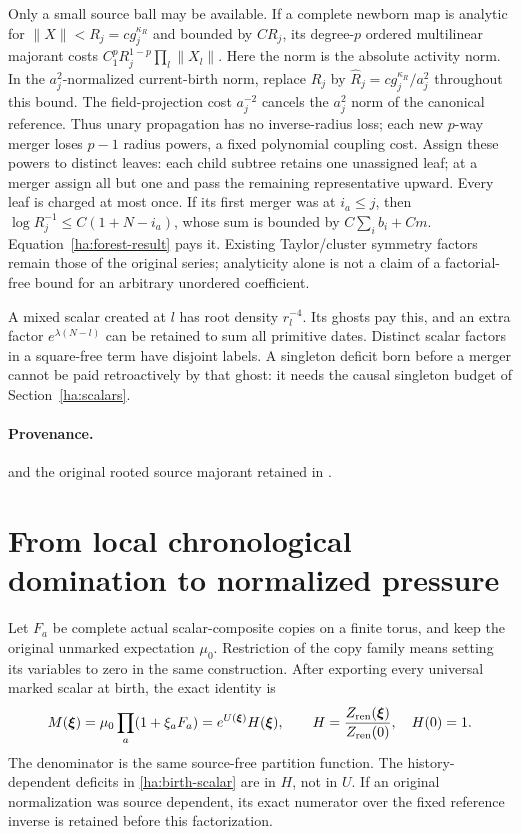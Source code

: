 Only a small source ball may be available.  If a complete newborn map
is analytic for $\|X\|<R_j=cg_j^{\kappa_R}$ and bounded by $CR_j$,
its degree-$p$ ordered multilinear majorant costs
$C_1^pR_j^{1-p}\prod_l\|X_l\|$. Here the norm is the absolute
activity norm. In the $a_j^2$-normalized current-birth norm, replace
$R_j$ by $\widehat R_j=cg_j^{\kappa_R}/a_j^2$ throughout this bound.
The field-projection cost $a_j^{-2}$ cancels the $a_j^2$ norm of the
canonical reference. Thus unary propagation has no inverse-radius loss;
each new $p$-way merger loses $p-1$ radius powers, a fixed polynomial
coupling cost. Assign these powers
to distinct leaves: each child subtree retains one unassigned leaf;
at a merger assign all but one and pass the remaining representative
upward.  Every leaf is charged at most once.  If its first merger was
at $i_a\leq j$, then
$\log R_j^{-1}\leq C(1+N-i_a)$, whose sum is bounded by
$C\sum_i b_i+Cm$.  Equation~\eqref{ha:forest-result} pays it.
Existing Taylor/cluster symmetry factors remain those of the original
series; analyticity alone is not a claim of a factorial-free bound for
an arbitrary unordered coefficient.

A mixed scalar created at $l$ has root density $r_l^{-4}$.  Its ghosts
pay this, and an extra factor $e^{\lambda(N-l)}$ can be retained to
sum all primitive dates.  Distinct scalar factors in a square-free
term have disjoint labels.  A singleton deficit born before a merger
cannot be paid retroactively by that ghost: it needs the causal
singleton budget of Section~\ref{ha:scalars}.

\paragraph{Provenance.}
and the original rooted source majorant retained in
.

\section{From local chronological domination to normalized pressure}
\label{ha:pressure}

Let $F_a$ be complete actual scalar-composite copies on a finite torus,
and keep the original unmarked expectation $\mu_0$.  Restriction of the
copy family means setting its variables to zero in the same construction.
After exporting every universal marked scalar at birth, the exact identity is
\begin{equation}
 M(\boldsymbol\xi)=\mu_0\prod_a(1+\xi_aF_a)
     =e^{U(\boldsymbol\xi)}H(\boldsymbol\xi),\qquad
 H=\frac{Z_{\rm ren}(\boldsymbol\xi)}{Z_{\rm ren}(0)},
 \quad H(0)=1.
 \label{ha:pressure-identity}
\end{equation}
The denominator is the same source-free partition function.  The
history-dependent deficits in \eqref{ha:birth-scalar} are in $H$, not
in $U$.  If an original normalization was source dependent, its exact
numerator over the fixed reference inverse is retained before this
factorization.

